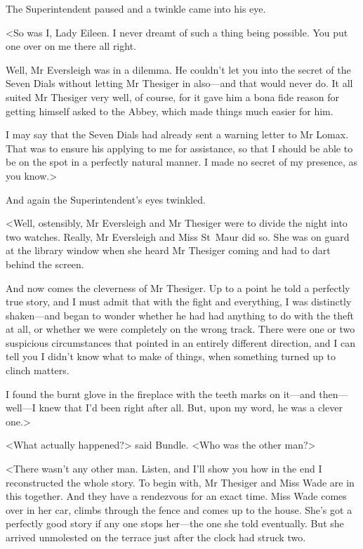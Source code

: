 The Superintendent paused and a twinkle came into his eye.

<So was I, Lady Eileen. I never dreamt of such a thing being possible. You put one over on me there all right.

Well, Mr Eversleigh was in a dilemma. He couldn't let you into the secret of the Seven Dials without letting Mr Thesiger in also—and that would never do. It all suited Mr Thesiger very well, of course, for it gave him a bona fide reason for getting himself asked to the Abbey, which made things much easier for him.

I may say that the Seven Dials had already sent a warning letter to Mr Lomax. That was to ensure his applying to me for assistance, so that I should be able to be on the spot in a perfectly natural manner. I made no secret of my presence, as you know.>

And again the Superintendent's eyes twinkled.

<Well, ostensibly, Mr Eversleigh and Mr Thesiger were to divide the night into two watches. Really, Mr Eversleigh and Miss St~Maur did so. She was on guard at the library window when she heard Mr Thesiger coming and had to dart behind the screen.

And now comes the cleverness of Mr Thesiger. Up to a point he told a perfectly true story, and I must admit that with the fight and everything, I was distinctly shaken—and began to wonder whether he had had anything to do with the theft at all, or whether we were completely on the wrong track. There were one or two suspicious circumstances that pointed in an entirely different direction, and I can tell you I didn't know what to make of things, when something turned up to clinch matters.

I found the burnt glove in the fireplace with the teeth marks on it—and then—well—I knew that I'd been right after all. But, upon my word, he was a clever one.>

<What actually happened?> said Bundle. <Who was the other man?>

<There wasn't any other man. Listen, and I'll show you how in the end I reconstructed the whole story. To begin with, Mr Thesiger and Miss Wade are in this together. And they have a rendezvous for an exact time. Miss Wade comes over in her car, climbs through the fence and comes up to the house. She's got a perfectly good story if any one stops her—the one she told eventually. But she arrived unmolested on the terrace just after the clock had struck two.


